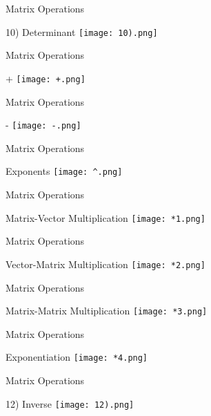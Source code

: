 \documentclass[10pt]{beamer}
\begin{document}
\begin{frame}{Matrix Operations}
\begin{block}{10) Determinant}
\center
\texttt{[image: 10).png]}
\end{block}
\end{frame}\begin{frame}{Matrix Operations}
\begin{block}{+}
\center
\texttt{[image: +.png]}
\end{block}
\end{frame}\begin{frame}{Matrix Operations}
\begin{block}{-}
\center
\texttt{[image: -.png]}
\end{block}
\end{frame}
\begin{frame}{Matrix Operations}
\begin{block}{Exponents}
\center
\texttt{[image: ^.png]}
\end{block}
\end{frame}
\begin{frame}{Matrix Operations}
\begin{block}{Matrix-Vector Multiplication}
\center
\texttt{[image: *1.png]}
\end{block}
\end{frame}
\begin{frame}{Matrix Operations}
\begin{block}{Vector-Matrix Multiplication}
\center
\texttt{[image: *2.png]}
\end{block}
\end{frame}
\begin{frame}{Matrix Operations}
\begin{block}{Matrix-Matrix Multiplication}
\center
\texttt{[image: *3.png]}
\end{block}
\end{frame}
\begin{frame}{Matrix Operations}
\begin{block}{Exponentiation}
\center
\texttt{[image: *4.png]}
\end{block}
\end{frame}
\begin{frame}{Matrix Operations}
\begin{block}{12) Inverse}
\center
\texttt{[image: 12).png]}
\end{block}
\end{frame}
\end{document}
